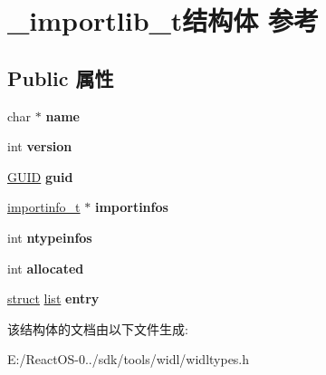 \hypertarget{struct__importlib__t}{}\section{\+\_\+importlib\+\_\+t结构体 参考}
\label{struct__importlib__t}
\subsection*{Public 属性}
\begin{DoxyCompactItemize}
\item 
\mbox{\label{struct__importlib__t_af1df2b006a909fb5756109d36a9180ce}} 
char $\ast$ {\bfseries name}
\item 
\mbox{\label{struct__importlib__t_a9c981847604570a1860d7e53bd130418}} 
int {\bfseries version}
\item 
\mbox{\label{struct__importlib__t_ae7d29de728d3f7273c560c414ad9c37d}} 
\hyperlink{interface_g_u_i_d}{G\+U\+ID} {\bfseries guid}
\item 
\mbox{\label{struct__importlib__t_ad57772fdae2b174b9b5154a755f0b597}} 
\hyperlink{struct__importinfo__t}{importinfo\+\_\+t} $\ast$ {\bfseries importinfos}
\item 
\mbox{\label{struct__importlib__t_aeae706177ce827e5d47e652c09a89fb3}} 
int {\bfseries ntypeinfos}
\item 
\mbox{\label{struct__importlib__t_a60ad82d05005dcc0af10b1698cd7e46f}} 
int {\bfseries allocated}
\item 
\mbox{\label{struct__importlib__t_a50bc0a1280b38b7e93f98ee49114a6c6}} 
\hyperlink{interfacestruct}{struct} \hyperlink{classlist}{list} {\bfseries entry}
\end{DoxyCompactItemize}


该结构体的文档由以下文件生成\+:\begin{DoxyCompactItemize}
\item 
E\+:/\+React\+O\+S-\/0../sdk/tools/widl/widltypes.\+h\end{DoxyCompactItemize}
